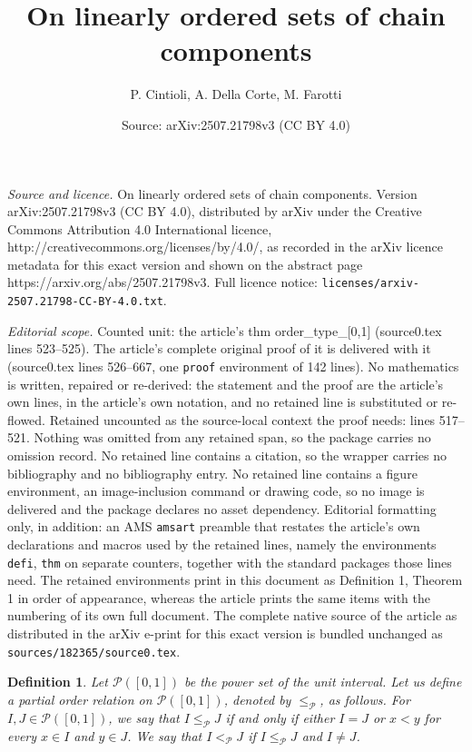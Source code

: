 \documentclass[10pt,a4paper]{amsart}
\title{On linearly ordered sets of chain components}
\author{P. Cintioli, A. Della Corte, M. Farotti}
\date{Source: arXiv:2507.21798v3 (CC BY 4.0)}
\newtheorem{defi}{Definition}
\begin{document}
\maketitle

\noindent\emph{Source and licence.} On linearly ordered sets of chain components. Version arXiv:2507.21798v3 (CC BY 4.0), distributed by arXiv under the Creative Commons Attribution 4.0 International licence, http://creativecommons.org/licenses/by/4.0/, as recorded in the arXiv licence metadata for this exact version and shown on the abstract page https://arxiv.org/abs/2507.21798v3. Full licence notice: \texttt{licenses/arxiv-2507.21798-CC-BY-4.0.txt}.\par\smallskip

\noindent\textit{Editorial scope.} Counted unit: the article's thm order\_type\_[0,1] (source0.tex lines 523--525). The article's complete original proof of it is delivered with it (source0.tex lines 526--667, one \texttt{proof} environment of 142 lines). No mathematics is written, repaired or re-derived: the statement and the proof are the article's own lines, in the article's own notation, and no retained line is substituted or re-flowed.  Retained uncounted as the source-local context the proof needs: lines 517--521.  Nothing was omitted from any retained span, so the package carries no omission record.  No retained line contains a citation, so the wrapper carries no bibliography and no bibliography entry.  No retained line contains a figure environment, an image-inclusion command or drawing code, so no image is delivered and the package declares no asset dependency.  Editorial formatting only, in addition: an AMS \texttt{amsart} preamble that restates the article's own declarations and macros used by the retained lines, namely the environments \texttt{defi}, \texttt{thm} on separate counters, together with the standard packages those lines need.  The retained environments print in this document as Definition 1, Theorem 1 in order of appearance, whereas the article prints the same items with the numbering of its own full document.  The complete native source of the article as distributed in the arXiv e-print for this exact version is bundled unchanged as \texttt{sources/182365/source0.tex}.
\begin{defi}\label{def_order_power}
    Let $\mathcal{P}([0,1])$ be the power set of the unit interval. 
    Let us define a partial order relation on $\mathcal{P}([0,1])$, denoted by $\le_{\mathcal{P}}$, as follows.
    For $I,J\in \mathcal{P}([0,1])$, we say that $I\leq_{\mathcal{P}} J$ if and only if either $I=J$ or $x<y$ for every $x\in I$ and $y\in J$. We say that $I <_\mathcal{P} J$ if $I\le_\mathcal{P} J$ and $I\neq J$.
\end{defi}
\end{document}
